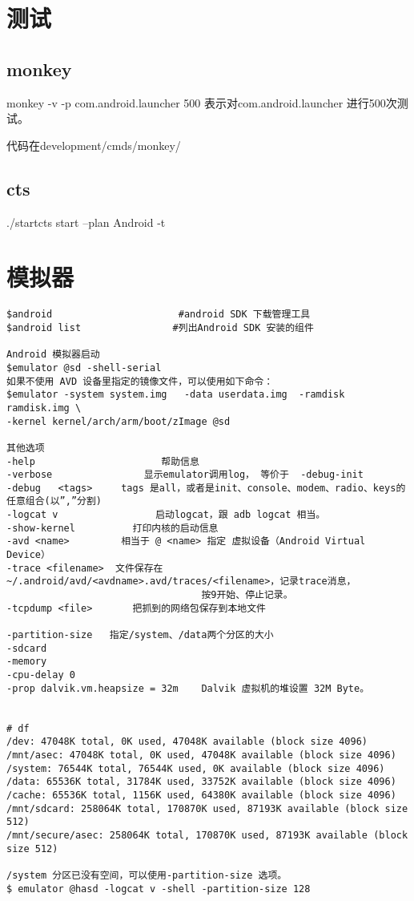 \documentclass[a4paper,titlepage]{article}
\begin{document}
\section{测试}
\subsection{monkey}\label{monkey}
monkey -v -p com.android.launcher 500
表示对com.android.launcher 进行500次测试。

代码在development/cmds/monkey/

\subsection{cts}
 ./startcts
   start --plan Android -t



\section{模拟器}
\begin{verbatim}
$android                      #android SDK 下载管理工具
$android list                #列出Android SDK 安装的组件 

Android 模拟器启动 
$emulator @sd -shell-serial 
如果不使用 AVD 设备里指定的镜像文件，可以使用如下命令： 
$emulator -system system.img   -data userdata.img  -ramdisk ramdisk.img \
-kernel kernel/arch/arm/boot/zImage @sd 

其他选项 
-help                      帮助信息
-verbose                显示emulator调用log， 等价于  -debug-init 
-debug   <tags>     tags 是all，或者是init、console、modem、radio、keys的任意组合(以”,”分割)
-logcat v                 启动logcat，跟 adb logcat 相当。
-show-kernel          打印内核的启动信息 
-avd <name>         相当于 @ <name> 指定 虚拟设备（Android Virtual Device） 
-trace <filename>  文件保存在~/.android/avd/<avdname>.avd/traces/<filename>，记录trace消息， 
                                  按9开始、停止记录。
-tcpdump <file>       把抓到的网络包保存到本地文件

-partition-size   指定/system、/data两个分区的大小 
-sdcard 
-memory 
-cpu-delay 0 
-prop dalvik.vm.heapsize = 32m    Dalvik 虚拟机的堆设置 32M Byte。 


# df       
/dev: 47048K total, 0K used, 47048K available (block size 4096) 
/mnt/asec: 47048K total, 0K used, 47048K available (block size 4096) 
/system: 76544K total, 76544K used, 0K available (block size 4096) 
/data: 65536K total, 31784K used, 33752K available (block size 4096) 
/cache: 65536K total, 1156K used, 64380K available (block size 4096) 
/mnt/sdcard: 258064K total, 170870K used, 87193K available (block size 512) 
/mnt/secure/asec: 258064K total, 170870K used, 87193K available (block size 512)

/system 分区已没有空间，可以使用-partition-size 选项。
$ emulator @hasd -logcat v -shell -partition-size 128
\end{verbatim}
\end{document}
